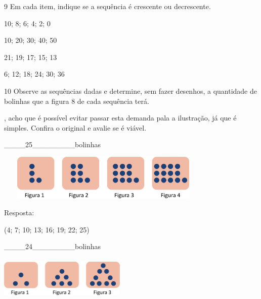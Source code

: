 \begin{escolha}
\begin{escolha}
\end{escolha}

\num{9} Em cada item, indique se a sequência é crescente ou decrescente.

\begin{escolha}

\item
  10; 8; 6; 4; 2; 0

\item
  10; 20; 30; 40; 50

\item
  21; 19; 17; 15; 13

\item
  6; 12; 18; 24; 30; 36

\end{escolha}

\num{10} Observe as sequências dadas e determine, sem fazer desenhos, a
quantidade de bolinhas que a figura 8 de cada sequência terá.

\Paulo, acho que é possível evitar passar esta demanda pala a ilustração, já que é simples. Confira o original e avalie se é viável.

\begin{escolha}

\item
  \_\_\_\_25\_\_\_\_\_\_\_\_bolinhas
\end{escolha}

\includegraphics[width=4.09202in,height=0.85841in]{media/image32.png}


Resposta:

(4; 7; 10; 13; 16; 19; 22; 25)

\begin{escolha}

\item
  \_\_\_\_24\_\_\_\_\_\_\_\_bolinhas
\end{escolha}

\includegraphics[width=2.38354in,height=0.81674in]{media/image33.png}


\end{escolha}
